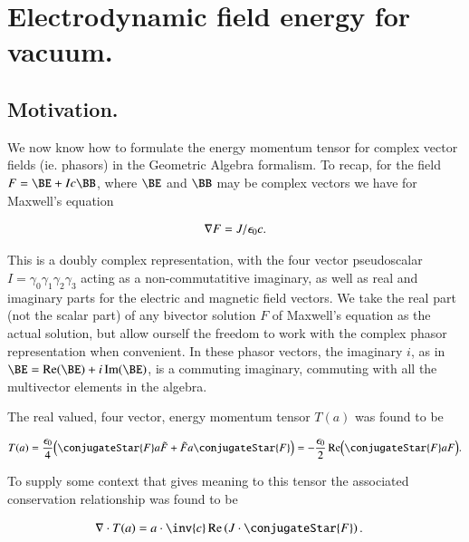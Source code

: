 %

\chapter{Electrodynamic field energy for vacuum.}
\label{chap:fourierMaxVac}
{}
\date{Dec 16, 2009}

\beginArtWithToc

\section{Motivation.}

We now know how to formulate the energy momentum tensor for complex vector fields (ie. phasors) in the Geometric Algebra formalism.  To recap, for the field $F = \BE + I c \BB$, where $\BE$ and $\BB$ may be complex vectors we have for Maxwell's equation

\begin{align}\label{eqn:fourierMaxVac:1}
\nabla F = J/\epsilon_0 c.
\end{align}

This is a doubly complex representation, with the four vector pseudoscalar $I = \gamma_0 \gamma_1 \gamma_2 \gamma_3$ acting as a non-commutatitive imaginary, as well as real and imaginary parts for the electric and magnetic field vectors.  We take the real part (not the scalar part) of any bivector solution $F$ of Maxwell's equation as the actual solution, but allow ourself the freedom to work with the complex phasor representation when convenient.  In these phasor vectors, the imaginary $i$, as in $\BE = \Real(\BE) + i \Imag(\BE)$, is a commuting imaginary, commuting with all the multivector elements in the algebra.

The real valued, four vector, energy momentum tensor $T(a)$ was found to be

\begin{align}\label{eqn:fourierMaxVac:2}
T(a) = \frac{\epsilon_0}{4} \Bigl( \conjugateStar{F} a \tilde{F} + \tilde{F} a \conjugateStar{F} \Bigr) = 
-\frac{\epsilon_0}{2} \Real \Bigl( \conjugateStar{F} a F \Bigr).
\end{align}

To supply some context that gives meaning to this tensor the associated conservation relationship was found to be

\begin{align}\label{eqn:fourierMaxVac:3}
\grad \cdot T(a) &= a \cdot \inv{ c } \Real \left( J \cdot \conjugateStar{F} \right).
\end{align}

